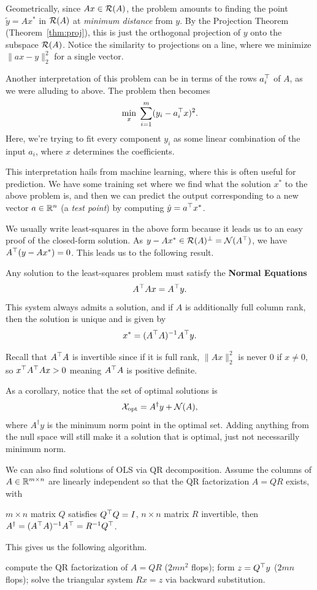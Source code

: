 \documentclass[11 pt]{scrartcl}
\newcommand{\opt}{\text{opt}}
\begin{document}
Geometrically, since $Ax\in \mathcal R(A)$, the problem amounts to finding the point $\tilde{y} = Ax^*$ in $\mathcal R(A)$ at \emph{minimum distance} from $y$. 
By the Projection Theorem (Theorem~\ref{thm:proj}), this is just the orthogonal projection of $y$ onto the subspace $\mathcal R(A)$.
Notice the similarity to projections on a line, where we minimize $\|ax-y\|_2^2$ for a single vector. 

Another interpretation of this problem can be in terms of the rows $a_i^\top$ of $A$, as we were alluding to above. 
The problem then becomes 
\[ \min_x \; \sum_{i=1}^m (y_i - a_i^\top x)^2.\] 
Here, we're trying to fit every component $y_i$ as some linear combination of the input $a_i$, where $x$ determines the coefficients. 

This interpretation hails from machine learning, where this is often useful for prediction. 
We have some training set where we find what the solution $x^*$ to the above problem is, and then we can predict the output corresponding to a new vector $a\in \mathbb R^n$ (a \emph{test point}) by computing $\hat{y} = a^\top x^*$. 

We usually write least-squares in the above form because it leads us to an easy proof of the closed-form solution. 
As $y-Ax^* \in \mathcal R(A)^\perp = \mathcal N(A^\top)$, we have $A^\top (y - Ax^*) = 0$. 
This leads us to the following result. 

\begin{theorem}
Any solution to the least-squares problem must satisfy the \textbf{Normal Equations} 
    \[ A^\top Ax = A^\top y.\] 
This system always admits a solution, and if $A$ is additionally full column rank, then the solution is unique and is given by 
\[ x^* = (A^\top A)^{-1} A^\top y.\] 
\end{theorem}
Recall that $A^\top A$ is invertible since if it is full rank, $\|Ax\|_2^2$ is never 0 if $x\not= 0$, so $x^\top A^\top A x > 0$ meaning $A^\top A$ is positive definite. 

As a corollary, notice that the set of optimal solutions is 
\[ \Xcal_{\opt} = A^\dagger y + \Ncal(A),\] 
where $A^\dagger y$ is the minimum norm point in the optimal set. 
Adding anything from the null space will still make it a solution that is optimal, just not necessarilly minimum norm. 

We can also find solutions of OLS via QR decomposition. 
Assume the columns of $A\in \mathbb R^{m\times n}$ are linearly independent so that the QR factorization $A = QR$ exists, with 
\begin{itemize}
    \ii $m\times n$ matrix $Q$ satisfies $Q^\top Q = I$, 
    \ii $n\times n$ matrix $R$ invertible,
    \ii then $A^\dagger = (A^\top A)^{-1} A^\top = R^{-1} Q^\top$.
\end{itemize}
This gives us the following algorithm.
\begin{itemize}
    \ii compute the QR factorization of $A = QR$ ($2mn^2$ flops);
    \ii form $z = Q^\top y$ ($2mn$ flops); 
    \ii solve the triangular system $Rx = z$ via backward substitution. 
\end{itemize}
\end{document}
